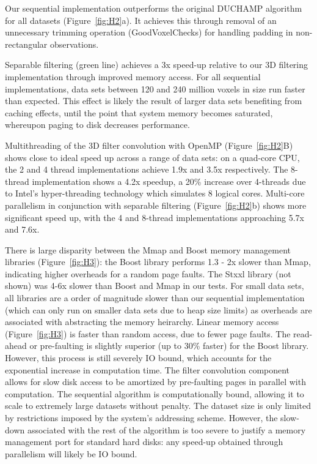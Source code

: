 Our sequential implementation outperforms the original DUCHAMP algorithm for all datasets (Figure~\ref{fig:H2}a).  It achieves this through removal of an unnecessary  trimming operation (GoodVoxelChecks) for handling padding in non-rectangular observations.  

Separable filtering (green line) achieves a 3x speed-up relative to our 3D filtering implementation  through improved memory access. For all sequential implementations, data sets between  120 and 240 million voxels in size run faster than expected. This effect is likely the result of larger data sets benefiting from caching effects, until  the point that system memory becomes saturated, whereupon paging to disk decreases performance.

Multithreading  of the 3D filter convolution  with OpenMP (Figure~\ref{fig:H2}B) shows close to ideal speed up across a range of data sets: on a quad-core CPU, the 2 and 4 thread implementations achieve 1.9x and 3.5x respectively.  The 8-thread implementation shows a 4.2x speedup, a 20\% increase over 4-threads due to  Intel's hyper-threading technology which simulates 8 logical cores. Multi-core parallelism in conjunction with separable filtering (Figure~\ref{fig:H2}b) shows more significant speed up, with the 4 and 8-thread implementations approaching 5.7x and 7.6x. 

There is large disparity between the Mmap and Boost memory management libraries (Figure~\ref{fig:H3}): the Boost library performs  1.3 - 2x slower than Mmap, indicating higher overheads for a random page faults.   The Stxxl library (not shown) was 4-6x slower than Boost and Mmap in our tests. For small data sets, all libraries are a order of magnitude slower than our sequential implementation (which can only run on smaller data sets due to heap size limits) as overheads are associated with abstracting the memory heirarchy. Linear memory access (Figure~\ref{fig:H3}) is faster than random access, due to fewer page faults. The read-ahead or pre-faulting is slightly superior (up to 30\% faster) for the Boost library. However, this process is still severely IO bound,  which accounts for the exponential increase in computation time. The filter convolution component allows for slow disk access to be amortized by pre-faulting pages in parallel with computation. The sequential algorithm is  computationally bound, allowing it to scale to extremely large datasets without penalty. The dataset size is only limited by restrictions imposed by the system's addressing scheme. However, the slow-down associated with the rest of the algorithm is too severe to justify a memory management port for standard hard disks: any speed-up obtained through parallelism will likely be IO bound.

